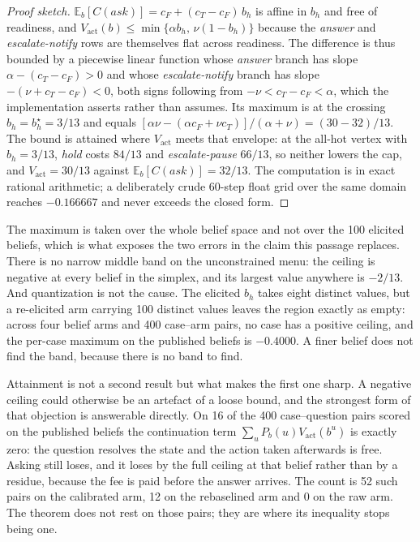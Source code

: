 \documentclass{article}
\begin{document}
\begin{proof}[Proof sketch]
$\mathbb{E}_b[C(\textit{ask})] = c_F + (c_T - c_F)\,b_h$ is affine in $b_h$ and
free of readiness, and $V_{\mathrm{act}}(b) \le \min\{\alpha b_h,\, \nu(1 - b_h)\}$
because the \emph{answer} and \emph{escalate-notify} rows are themselves flat
across readiness. The difference is thus bounded by a piecewise linear function
whose \emph{answer} branch has slope $\alpha - (c_T - c_F) > 0$ and whose
\emph{escalate-notify} branch has slope $-(\nu + c_T - c_F) < 0$, both signs
following from $-\nu < c_T - c_F < \alpha$, which the implementation asserts
rather than assumes. Its maximum is at the crossing $b_h = b_h^{\star} = 3/13$
and equals $[\alpha\nu - (\alpha c_F + \nu c_T)]/(\alpha + \nu) = (30 - 32)/13$.
The bound is attained where $V_{\mathrm{act}}$ meets that envelope: at the
all-hot vertex with $b_h = 3/13$, \emph{hold} costs $84/13$ and
\emph{escalate-pause} $66/13$, so neither lowers the cap, and
$V_{\mathrm{act}} = 30/13$ against $\mathbb{E}_b[C(\textit{ask})] = 32/13$. The
computation is in exact rational arithmetic; a deliberately crude 60-step float
grid over the same domain reaches $-0.166667$ and never exceeds the closed form.
\end{proof}

The maximum is taken over the whole belief space and not over the 100 elicited
beliefs, which is what exposes the two errors in the claim this passage replaces.
There is no narrow middle band on the unconstrained menu: the ceiling is negative
at every belief in the simplex, and its largest value anywhere is $-2/13$. And
quantization is not the cause. The elicited $b_h$ takes eight distinct values, but
a re-elicited arm carrying 100 distinct values leaves the region exactly as empty:
across four belief arms and 400 case--arm pairs, no case has a positive ceiling,
and the per-case maximum on the published beliefs is $-0.4000$. A finer belief
does not find the band, because there is no band to find.

Attainment is not a second result but what makes the first one sharp. A negative
ceiling could otherwise be an artefact of a loose bound, and the strongest form of
that objection is answerable directly. On 16 of the 400 case--question pairs scored
on the published beliefs the continuation term $\sum_u P_b(u) V_{\mathrm{act}}(b^u)$
is exactly zero: the question resolves the state and the action taken afterwards is
free. Asking still loses, and it loses by the full ceiling at that belief rather
than by a residue, because the fee is paid before the answer arrives. The count is
52 such pairs on the calibrated arm, 12 on the rebaselined arm and 0 on the raw
arm. The theorem does not rest on those pairs; they are where its inequality stops
being one.
\end{document}

